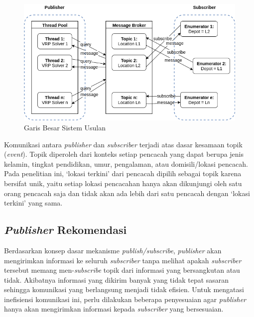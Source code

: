 \begin{figure}[!]
	\centering
	\includegraphics[width=\textwidth]{Resources/Images/system-overview}
	\captionsetup{format=hang}
	\caption{Garis Besar Sistem Usulan}
	\label{fig:system-overview}
\end{figure}


Komunikasi antara \textit{publisher} dan \textit{subscriber} terjadi atas dasar kesamaan topik (\textit{event}). Topik diperoleh dari konteks setiap pencacah yang dapat berupa jenis kelamin, tingkat pendidikan, umur, pengalaman, atau domisili/lokasi pencacah. Pada penelitian ini, `lokasi terkini' dari pencacah dipilih sebagai topik karena bersifat unik, yaitu setiap lokasi pencacahan hanya akan dikunjungi oleh satu orang pencacah saja dan tidak akan ada lebih dari satu pencacah dengan `lokasi terkini' yang sama.


\subsection{\textit{Publisher} Rekomendasi}
\label{ssec:publisher}
Berdasarkan konsep dasar mekanisme \textit{publish/subscribe}, \textit{publisher} akan mengirimkan informasi ke seluruh \textit{subscriber} tanpa melihat apakah \textit{subscriber} tersebut memang men-\textit{subscribe} topik dari informasi yang bersangkutan atau tidak. Akibatnya informasi yang dikirim banyak yang tidak tepat sasaran sehingga komunikasi yang berlangsung menjadi tidak efisien. Untuk mengatasi inefisiensi komunikasi ini, perlu dilakukan beberapa penyesuaian agar \textit{publisher} hanya akan mengirimkan informasi kepada \textit{subscriber} yang bersesuaian. 

